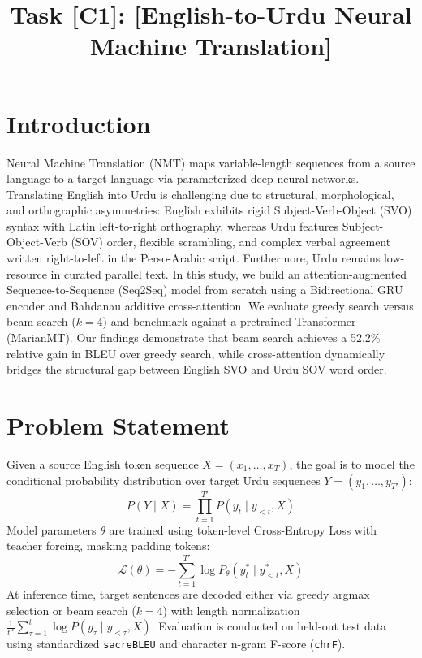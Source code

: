 \documentclass[conference]{IEEEtran}
\begin{document}
\title{Task [C1]: [English-to-Urdu Neural Machine Translation]}

\author{
}

\maketitle

\section{Introduction}
Neural Machine Translation (NMT) maps variable-length sequences from a source language to a target language via parameterized deep neural networks. Translating English into Urdu is challenging due to structural, morphological, and orthographic asymmetries: English exhibits rigid Subject-Verb-Object (SVO) syntax with Latin left-to-right orthography, whereas Urdu features Subject-Object-Verb (SOV) order, flexible scrambling, and complex verbal agreement written right-to-left in the Perso-Arabic script. Furthermore, Urdu remains low-resource in curated parallel text. In this study, we build an attention-augmented Sequence-to-Sequence (Seq2Seq) model from scratch using a Bidirectional GRU encoder and Bahdanau additive cross-attention. We evaluate greedy search versus beam search ($k=4$) and benchmark against a pretrained Transformer (MarianMT). Our findings demonstrate that beam search achieves a 52.2\% relative gain in BLEU over greedy search, while cross-attention dynamically bridges the structural gap between English SVO and Urdu SOV word order.

\section{Problem Statement}
Given a source English token sequence $X = (x_1, \dots, x_T)$, the goal is to model the conditional probability distribution over target Urdu sequences $Y = (y_1, \dots, y_{T'})$:
\begin{equation}
P(Y \mid X) = \prod_{t=1}^{T'} P(y_t \mid y_{<t}, X)
\end{equation}
Model parameters $\theta$ are trained using token-level Cross-Entropy Loss with teacher forcing, masking padding tokens:
\begin{equation}
\mathcal{L}(\theta) = - \sum_{t=1}^{T'} \log P_\theta(y_t^* \mid y_{<t}^*, X)
\end{equation}
At inference time, target sentences are decoded either via greedy argmax selection or beam search ($k=4$) with length normalization $\frac{1}{t^\alpha} \sum_{\tau=1}^t \log P(y_\tau \mid y_{<\tau}, X)$. Evaluation is conducted on held-out test data using standardized \texttt{sacreBLEU} and character n-gram F-score (\texttt{chrF}).
\end{document}
